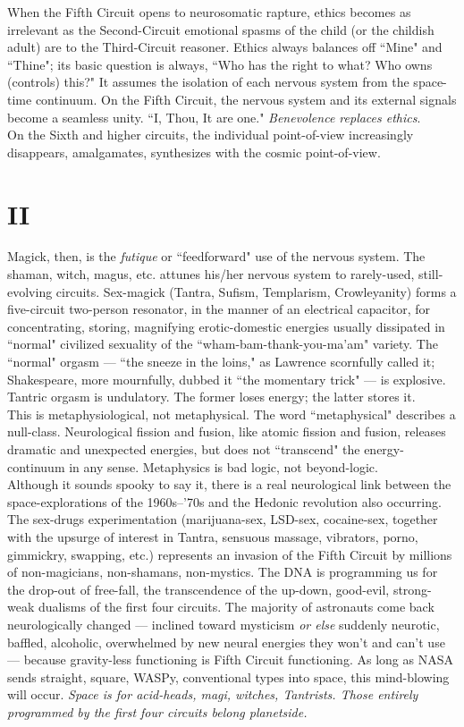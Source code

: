 \documentclass[12pt, onecolumn, letterpaper, oneside]{book}
\begin{document}
When the Fifth Circuit opens to neurosomatic rapture, ethics becomes as irrelevant as the Second-Circuit emotional spasms of the child (or the childish adult) are to the Third-Circuit reasoner. Ethics always balances off ``Mine" and ``Thine"; its basic question is always, ``Who has the right to what? Who owns (controls) this?" It assumes the isolation of each nervous system from the space-time continuum. On the Fifth Circuit, the nervous system and its external signals become a seamless unity. ``I, Thou, It are one." \emph{Benevolence replaces ethics}.\\
On the Sixth and higher circuits, the individual point-of-view increasingly disappears, amalgamates, synthesizes with the cosmic point-of-view.

\section*{II}
Magick, then, is the \emph{futique} or ``feedforward" use of the nervous system. The shaman, witch, magus, etc. attunes his/her nervous system to rarely-used, still-evolving circuits. Sex-magick (Tantra, Sufism, Templarism, Crowleyanity) forms a five-circuit two-person resonator, in the manner of an electrical capacitor, for concentrating, storing, magnifying erotic-domestic energies usually dissipated in ``normal" civilized sexuality of the ``wham-bam-thank-you-ma'am" variety. The ``normal" orgasm --- ``the sneeze in the loins," as Lawrence scornfully called it; Shakespeare, more mournfully, dubbed it ``the momentary trick" --- is explosive. Tantric orgasm is undulatory. The former loses energy; the latter stores it.\\
This is metaphysiological, not metaphysical. The word ``metaphysical" describes a null-class. Neurological fission and fusion, like atomic fission and fusion, releases dramatic and unexpected energies, but does not ``transcend" the energy-continuum in any sense. Metaphysics is bad logic, not beyond-logic.\\
Although it sounds spooky to say it, there is a real neurological link between the space-explorations of the 1960s--'70s and the Hedonic revolution also occurring. The sex-drugs experimentation (marijuana-sex, LSD-sex, cocaine-sex, together with the upsurge of interest in Tantra, sensuous massage, vibrators, porno, gimmickry, swapping, etc.) represents an invasion of the Fifth Circuit by millions of non-magicians, non-shamans, non-mystics. The DNA is programming us for the drop-out of free-fall, the transcendence of the up-down, good-evil, strong-weak dualisms of the first four circuits. The majority of astronauts come back neurologically changed --- inclined toward mysticism \emph{or else} suddenly neurotic, baffled, alcoholic, overwhelmed by new neural energies they won't and can't use --- because gravity-less functioning is Fifth Circuit functioning. As long as NASA sends straight, square, WASPy, conventional types into space, this mind-blowing will occur. \emph{Space is for acid-heads, magi, witches, Tantrists. Those entirely programmed by the first four circuits belong planetside.}\\
\end{document}
